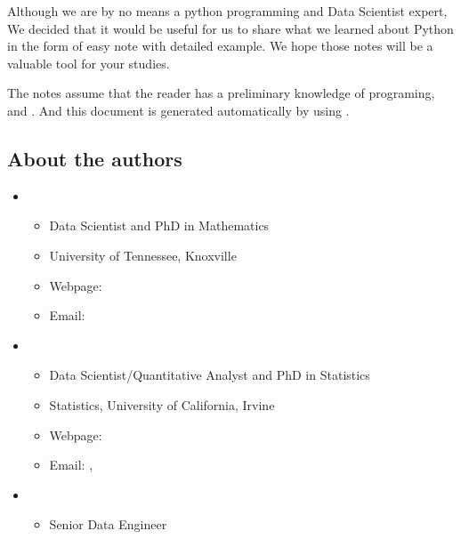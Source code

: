 \documentclass[letterpaper,12pt,english]{sphinxmanual}
\begin{document}
Although we are by no means a python programming and Data Scientist expert,
We decided that it would be useful for us to share what we learned
about Python in the form of easy note with detailed example.
We hope those notes will be a valuable tool for your studies.

The notes assume that the reader has a preliminary knowledge of  programing,  and . And this document is generated automatically by using .


\subsection{About the authors}
\label{\detokenize{preface:about-the-authors}}\begin{itemize}
\item {} 
\begin{itemize}
\item {} 
Data Scientist and PhD in Mathematics

\item {} 
University of Tennessee, Knoxville

\item {} 
Webpage: 

\item {} 
Email: 

\end{itemize}

\item {} 
\begin{itemize}
\item {} 
Data Scientist/Quantitative Analyst and PhD in Statistics

\item {} 
Statistics, University of California, Irvine

\item {} 
Webpage: 

\item {} 
Email: , 

\end{itemize}

\item {} 
\begin{itemize}
\item {} 
Senior Data Engineer


\end{itemize}
\end{itemize}
\end{document}
